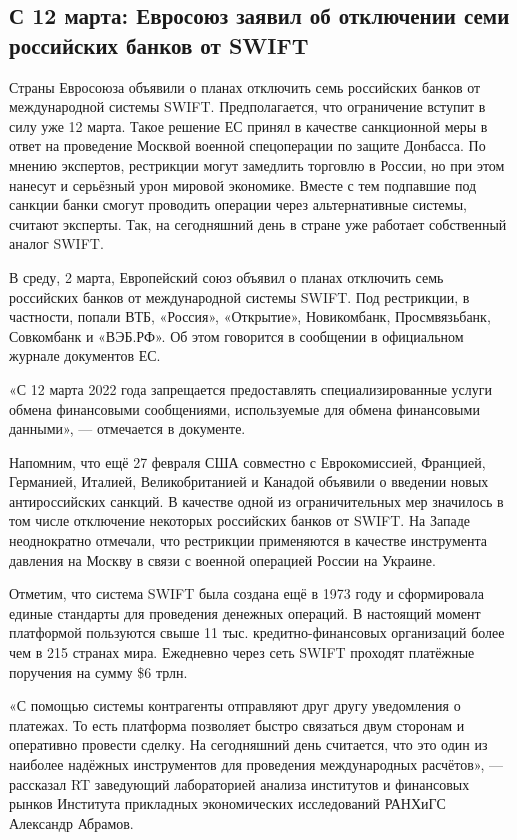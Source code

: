\subsection{С 12 марта: Евросоюз заявил об отключении семи российских банков от SWIFT}

Страны Евросоюза объявили о планах отключить семь российских банков от международной системы SWIFT. Предполагается, что ограничение вступит в силу уже 12 марта. Такое решение ЕС принял в качестве санкционной меры в ответ на проведение Москвой военной спецоперации по защите Донбасса. По мнению экспертов, рестрикции могут замедлить торговлю в России, но при этом нанесут и серьёзный урон мировой экономике. Вместе с тем подпавшие под санкции банки смогут проводить операции через альтернативные системы, считают эксперты. Так, на сегодняшний день в стране уже работает собственный аналог SWIFT.

В среду, 2 марта, Европейский союз объявил о планах отключить семь российских банков от международной системы SWIFT. Под рестрикции, в частности, попали  ВТБ, «Россия», «Открытие», Новикомбанк, Просмвязьбанк, Совкомбанк и «ВЭБ.РФ». Об этом говорится в сообщении в официальном журнале документов ЕС.

«С 12 марта 2022 года запрещается предоставлять специализированные услуги обмена финансовыми сообщениями, используемые для обмена финансовыми данными», ---  отмечается в документе.

Напомним, что ещё 27 февраля США совместно с Еврокомиссией, Францией, Германией, Италией, Великобританией и Канадой объявили о введении новых антироссийских санкций. В качестве одной из ограничительных мер значилось в том числе отключение некоторых российских банков от SWIFT. На Западе неоднократно отмечали, что рестрикции применяются в качестве инструмента давления на Москву в связи с военной операцией России на Украине.

Отметим, что система SWIFT была создана ещё в 1973 году и сформировала единые стандарты для проведения денежных операций. В настоящий момент платформой пользуются свыше 11 тыс. кредитно-финансовых организаций более чем в 215 странах мира. Ежедневно через сеть SWIFT проходят платёжные поручения на сумму \$6 трлн.

«С помощью системы контрагенты отправляют друг другу уведомления о платежах. То есть платформа позволяет быстро связаться двум сторонам и оперативно провести сделку. На сегодняшний день считается, что это один из наиболее надёжных инструментов для проведения международных расчётов», --- рассказал RT заведующий лабораторией анализа институтов и финансовых рынков Института прикладных экономических исследований РАНХиГС Александр Абрамов.

